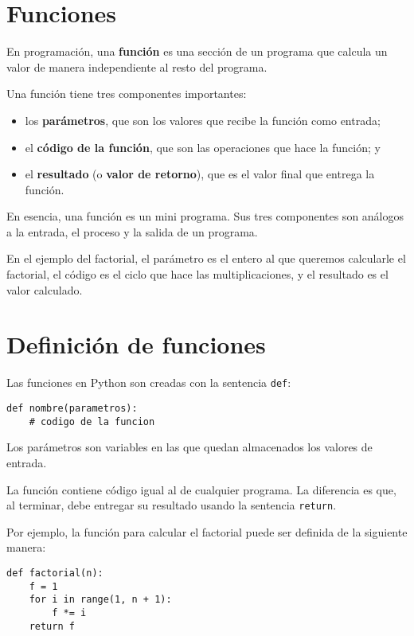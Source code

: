 \section{Funciones}

En programación, una \textbf{función} es una sección de un programa que
calcula un valor de manera independiente al resto del programa.

Una función tiene tres componentes importantes:

\begin{itemize}
\item
  los \textbf{parámetros}, que son los valores que recibe la función
  como entrada;
\item
  el \textbf{código de la función}, que son las operaciones que hace la
  función; y
\item
  el \textbf{resultado} (o \textbf{valor de retorno}), que es el valor
  final que entrega la función.
\end{itemize}

En esencia, una función es un mini programa. Sus tres componentes son
análogos a la entrada, el proceso y la salida de un programa.

En el ejemplo del factorial, el parámetro es el entero al que queremos
calcularle el factorial, el código es el ciclo que hace las
multiplicaciones, y el resultado es el valor calculado.

\section{Definición de funciones}

Las funciones en Python son creadas con la sentencia
\lstinline!def!:

\begin{lstlisting}
def nombre(parametros):
    # codigo de la funcion
\end{lstlisting}

Los parámetros son variables en las que quedan almacenados los valores
de entrada.

La función contiene código igual al de cualquier programa. La diferencia
es que, al terminar, debe entregar su resultado usando la sentencia
\lstinline!return!.

Por ejemplo, la función para calcular el factorial puede ser definida de
la siguiente manera:

\begin{lstlisting}
def factorial(n):
    f = 1
    for i in range(1, n + 1):
        f *= i
    return f
\end{lstlisting}

